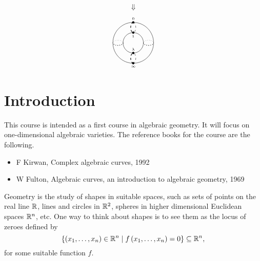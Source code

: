 {$$$$
$$ \Downarrow $$
$$
\begin{tikzpicture}[scale=0.5]
\draw (0, 0) circle (2);
\draw (0, 0) circle (1);
\draw [dashed] (0, 2) arc (90:-90:0.25 and 0.5);
\draw [dashed, thick] (0, 2) arc (90:270:0.25 and 0.5);
\draw [fill=black] (0, 2) circle (0.1) node[above]{\tiny $ 0 $};
\draw [fill=black] (0, 1) circle (0.1) node[below]{\tiny $ 1 $};
\draw [dashed] (0, -2) arc (-90:90:0.25 and 0.5);
\draw [dashed, thick] (0, -2) arc (270:90:0.25 and 0.5);
\draw [fill=black] (0, -1) circle (0.1) node[above]{\tiny $ \lambda $};
\draw [fill=black] (0, -2) circle (0.1) node[below]{\tiny $ \infty $};
\draw [dotted] (-1, 0) arc (0:180:0.5 and 0.25);
\draw [dotted, thick] (-1, 0) arc (0:-180:0.5 and 0.25);
\draw [dotted] (1, 0) arc (180:0:0.5 and 0.25);
\draw [dotted, thick] (1, 0) arc (-180:0:0.5 and 0.25);
\end{tikzpicture}
$$
}
\def\syllabus{Affine plane algebraic curves. Projective space. Plane projective curves. Projectivisation. Points at infinity. Singularities. Smoothness. Intersections of plane curves. Resultants. Multiplicities. B\'ezout's theorem. Conics. Cubic curves. Riemann surfaces. Genus. Ramification. The Riemann-Hurwitz formula. The degree-genus formula.}

\def\thm{section}







\setcounter{section}{0}

\section{Introduction}


This course is intended as a first course in algebraic geometry. It will focus on one-dimensional algebraic varieties. The reference books for the course are the following.
\begin{itemize}
\item F Kirwan, Complex algebraic curves, 1992
\item W Fulton, Algebraic curves, an introduction to algebraic geometry, 1969
\end{itemize}
Geometry is the study of shapes in suitable spaces, such as sets of points on the real line $ \mathbb{R} $, lines and circles in $ \mathbb{R}^2 $, spheres in higher dimensional Euclidean spaces $ \mathbb{R}^n $, etc. One way to think about shapes is to see them as the locus of zeroes defined by
$$ \left\{ \left( x_1, \dots, x_n \right) \in \mathbb{R}^n \mid f\left( x_1, \dots, x_n \right) = 0 \right\} \subseteq \mathbb{R}^n, $$
for some suitable function $ f $.

